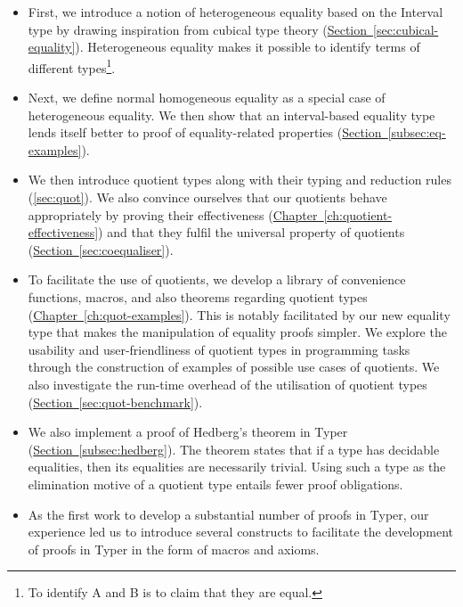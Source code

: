 \documentclass[12pt,twoside,maitrise]{dms}
\theoremstyle{definition}
\numberwithin{equation}{section}
\numberwithin{table}{chapter}
\numberwithin{figure}{chapter}
\begin{document}
\begin{itemize}
  \item{First, we introduce a notion of heterogeneous equality based on the
    Interval type by drawing inspiration from cubical type theory
    (\hyperref[sec:cubical-equality]{Section~\ref*{sec:cubical-equality}}).
    Heterogeneous equality makes it possible to identify terms of different
    types\footnote{To identify A and B is to claim that they are equal.}. }

  \item{Next, we define normal homogeneous equality as a special case of
    heterogeneous equality. We then show that an interval-based equality
    type lends itself better to proof of equality-related properties
    (\hyperref[subsec:eq-examples]{Section~\ref*{subsec:eq-examples}}).}

  \item{We then introduce quotient types along with their typing and reduction
    rules (\autoref{sec:quot}). We also convince ourselves that our quotients
    behave appropriately by proving their effectiveness
    (\hyperref[ch:quotient-effectiveness]{Chapter~\ref*{ch:quotient-effectiveness}})
    and that they fulfil the universal property of quotients
    (\hyperref[sec:coequaliser]{Section~\ref*{sec:coequaliser}}). }

  \item{To facilitate the use of quotients, we develop a library of convenience
      functions, macros, and also theorems regarding quotient types
      (\hyperref[ch:quot-examples]{Chapter~\ref*{ch:quot-examples}}). This is
      notably facilitated by our new equality type that makes the manipulation
      of equality proofs simpler. We explore the usability and
      user-friendliness of quotient types in programming tasks through the
      construction of examples of possible use cases of quotients. We also
      investigate the run-time overhead of the utilisation of quotient types
    (\hyperref[sec:quot-benchmark]{Section~\ref*{sec:quot-benchmark}}).}

  \item{We also implement a proof of Hedberg's
    theorem\cite{hedberg1998coherence} in Typer
    (\hyperref[subsec:hedberg]{Section~\ref*{subsec:hedberg}}). The theorem
    states that if a type has decidable equalities, then its equalities are
    necessarily trivial. Using such a type as the elimination motive of a
    quotient type entails fewer proof obligations. }

  \item{As the first work to develop a substantial number of proofs in Typer,
    our experience led us to introduce several constructs to facilitate the
    development of proofs in Typer in the form of macros and axioms. }
\end{itemize}
\end{document}
